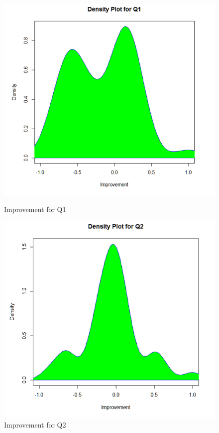 \begin{figure}
	\centering
	\begin{minipage}{.5\textwidth}
		\centering
		\includegraphics[width=1\linewidth]{figures/Prepost_q1}
		\caption{Improvement for Q1}
		\label{fig:Prepost_q1}
	\end{minipage}%
	\begin{minipage}{.5\textwidth}
		\centering
		\includegraphics[width=1\linewidth]{figures/Prepost_q2}
		\caption{Improvement for Q2}
		\label{fig:Prepost_q2}
	\end{minipage}
\end{figure}

